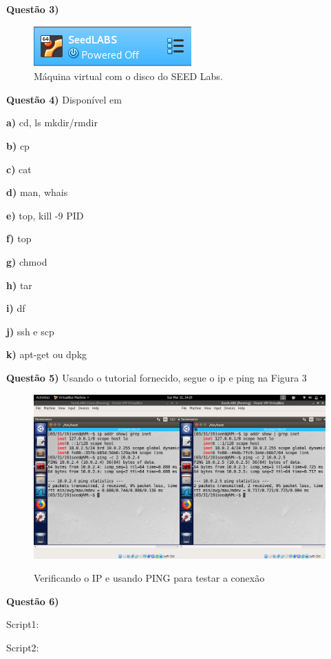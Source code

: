\documentclass[
	12pt,				%
	openright,			%
	oneside,			%
	a4paper,			%
	chapter=TITLE,		%
	subsection=TITLE,	%
	english,			%
	brazil,				%
	]{abntex2}
\begin{document}
\textbf{Questão 3)}
\begin{figure}[!h]
\centering
\includegraphics[scale=0.5]{Img/SeedInstall.png}
\caption[loftitle]{Máquina virtual com o disco do SEED Labs.}
\end{figure}

\textbf{Questão 4)} Disponível em \cite{michael}

\textbf{a)} cd, ls mkdir/rmdir

\textbf{b)} cp

\textbf{c)} cat

\textbf{d)} man, whais

\textbf{e)} top, kill -9 PID

\textbf{f)} top

\textbf{g)} chmod

\textbf{h)} tar

\textbf{i)} df

\textbf{j)} ssh e scp

\textbf{k)} apt-get ou dpkg


\textbf{Questão 5)} Usando o tutorial fornecido, segue o ip e ping na Figura 3



\begin{figure}[!h]
\centering
\includegraphics[scale=0.35]{Img/pingVb.png}
\label{IpPing}
\caption[loftitle]{Verificando o IP e usando PING para testar a conexão}
\end{figure}
\newpage
\textbf{Questão 6)}

Script1:


Script2: 





\end{document}
